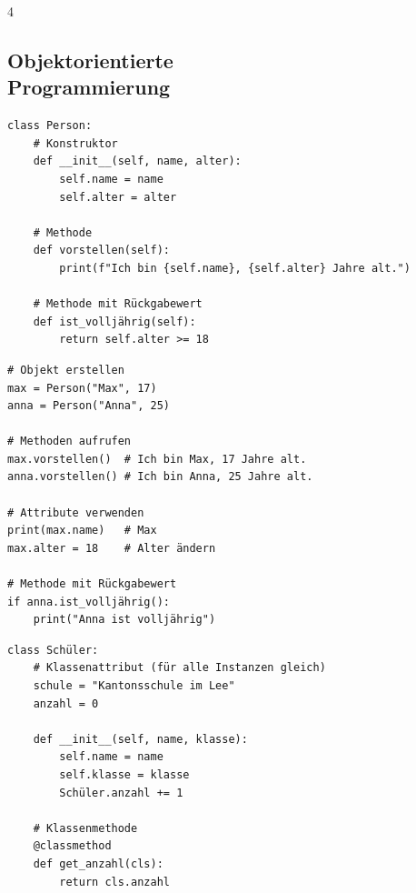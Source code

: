 \begin{landscape}
\begin{multicols*}{4}
		\columnbreak\textcolor{\cheatSheetColor}{\subsection*{Objektorientierte\\ Programmierung}}

		\begin{cheatSheetBox}[title=Klassen definieren]
			\begin{lstlisting}
class Person:
    # Konstruktor
    def __init__(self, name, alter):
        self.name = name
        self.alter = alter
    
    # Methode
    def vorstellen(self):
        print(f"Ich bin {self.name}, {self.alter} Jahre alt.")
    
    # Methode mit Rückgabewert
    def ist_volljährig(self):
        return self.alter >= 18
\end{lstlisting}
		\end{cheatSheetBox}

		\begin{cheatSheetBox}[title=Objekte erstellen und verwenden]
			\begin{lstlisting}
# Objekt erstellen
max = Person("Max", 17)
anna = Person("Anna", 25)

# Methoden aufrufen
max.vorstellen()  # Ich bin Max, 17 Jahre alt.
anna.vorstellen() # Ich bin Anna, 25 Jahre alt.

# Attribute verwenden
print(max.name)   # Max
max.alter = 18    # Alter ändern

# Methode mit Rückgabewert
if anna.ist_volljährig():
    print("Anna ist volljährig")
\end{lstlisting}
		\end{cheatSheetBox}

		\begin{cheatSheetBox}[title=Klassenattribute]
			\begin{lstlisting}
class Schüler:
    # Klassenattribut (für alle Instanzen gleich)
    schule = "Kantonsschule im Lee"
    anzahl = 0
    
    def __init__(self, name, klasse):
        self.name = name
        self.klasse = klasse
        Schüler.anzahl += 1
    
    # Klassenmethode
    @classmethod
    def get_anzahl(cls):
        return cls.anzahl
\end{lstlisting}
		\end{cheatSheetBox}


\end{multicols*}
\end{landscape}
